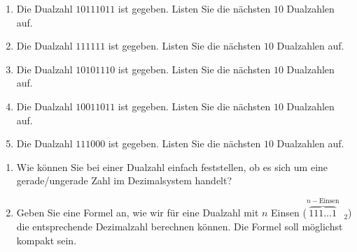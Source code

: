\begin{exercise}
\begin{enumerate}
\item Die Dualzahl $10111011$ ist gegeben. Listen Sie die nächsten $10$ Dualzahlen auf.
\fillwithgrid{1.25in}
\item Die Dualzahl $111111$ ist gegeben. Listen Sie die nächsten $10$ Dualzahlen auf.
\fillwithgrid{1.25in}
\item Die Dualzahl $10101110$ ist gegeben. Listen Sie die nächsten $10$ Dualzahlen auf.
\fillwithgrid{1.25in}
\item Die Dualzahl $10011011$ ist gegeben. Listen Sie die nächsten $10$ Dualzahlen auf.
\fillwithgrid{1.25in}
\item Die Dualzahl $111000$ ist gegeben. Listen Sie die nächsten $10$ Dualzahlen auf.
\fillwithgrid{1.25in}
\end{enumerate}
\end{exercise}

\begin{exercise}
\begin{enumerate}
\item Wie können Sie bei einer Dualzahl einfach feststellen, ob es sich um eine gerade/ungerade Zahl im Dezimalsystem handelt?
\fillwithgrid{0.5in}
\item Geben Sie eine Formel an, wie wir für eine Dualzahl mit $n$ Einsen ($\overbrace{111\dots1}^{n-\textrm{Einsen}}$~$_2$) die entsprechende Dezimalzahl berechnen können. Die Formel soll möglichst kompakt sein.
\end{enumerate}
\end{exercise}